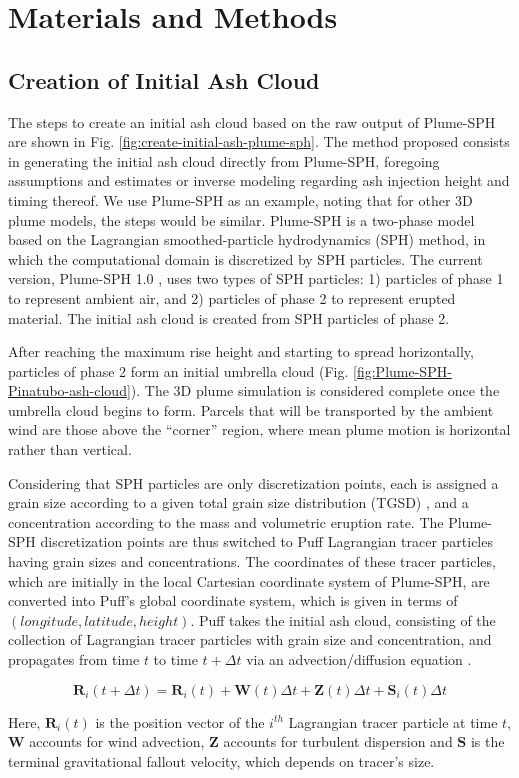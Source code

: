 \documentclass[utf8]{frontiersSCNS} %
\begin{document}
\section{Materials and Methods} \label{sec:Methodology}

\subsection{Creation of Initial Ash Cloud} \label{sec:create-initial-condition}
The steps to create an initial ash cloud based on the raw output of Plume-SPH are shown in Fig. \ref{fig:create-initial-ash-plume-sph}.
The method proposed consists in generating the initial ash cloud directly from Plume-SPH, foregoing assumptions and estimates or inverse modeling regarding ash injection height and timing thereof.
We use Plume-SPH as an example, noting that for other 3D plume models, the steps would be similar. Plume-SPH is a two-phase model based on the Lagrangian smoothed-particle hydrodynamics (SPH) method, in which the computational domain is discretized by SPH particles. The current version, Plume-SPH 1.0 \citep{cao2018plume}, uses two types of SPH particles: 1) particles of phase 1 to represent ambient air, and 2) particles of phase 2 to represent erupted material. The initial ash cloud is created from SPH particles of phase 2.

After reaching the maximum rise height and starting to spread horizontally, particles of phase 2 form an initial umbrella cloud (Fig. \ref{fig:Plume-SPH-Pinatubo-ash-cloud}). The 3D plume simulation is considered complete once the umbrella cloud begins to form. Parcels that will be transported by the ambient wind are those above the ``corner'' region, where mean plume motion is horizontal rather than vertical.

Considering that SPH particles are only discretization points, each is assigned a grain size according to a given total grain size distribution (TGSD) \citep{paladio1996tephra}, and a concentration according to the mass and volumetric eruption rate. The Plume-SPH discretization points are thus switched to Puff Lagrangian tracer particles having grain sizes and concentrations. The coordinates of these tracer particles, which are initially in the local Cartesian coordinate system of Plume-SPH, are converted into Puff's global coordinate system, which is given in terms of $(longitude, latitude, height)$. Puff takes the initial ash cloud, consisting of the collection of Lagrangian tracer particles with grain size and concentration, and propagates from time $t$ to time $t+\Delta t$ via an advection/diffusion equation \citep{searcy1998puff}.
\begin{linenomath*}
\begin{equation}
\textbf{R}_i(t+\Delta t) = \textbf{R}_i(t) + \textbf{W}(t)\Delta t + \textbf{Z}(t)\Delta t + \textbf{S}_i(t) \Delta t
\end{equation}
\end{linenomath*}
Here, $\textbf{R}_i(t)$ is the position vector of the $i^{th}$ Lagrangian tracer particle at time $t$, $\textbf{W}$ accounts for wind advection, $\textbf{Z}$ accounts for turbulent dispersion and $\textbf{S}$ is the terminal gravitational fallout velocity, which depends on tracer's size.
\end{document}
